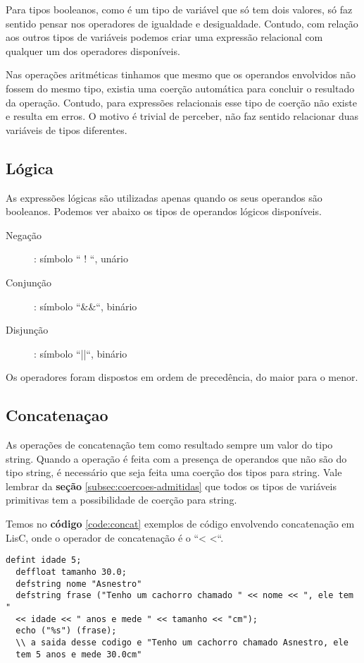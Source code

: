 \documentclass[
  12pt,				%
  oneside,			%
  a4paper,			%
  english,			%
  french,				%
  spanish,			%
  brazil,				%
]{abntex2}
\begin{document}
Para tipos booleanos, como é um tipo de variável que só tem dois
valores, só faz sentido pensar nos operadores de igualdade e
desigualdade. Contudo, com relação aos outros tipos de variáveis
podemos criar uma expressão relacional com qualquer um dos operadores
disponíveis.

Nas operações aritméticas tinhamos que mesmo que os
operandos envolvidos não fossem do mesmo tipo, existia uma coerção
automática para concluir o resultado da operação. Contudo, para
expressões relacionais esse tipo de coerção não existe e resulta em
erros. O motivo é trivial de perceber, não faz sentido relacionar duas
variáveis de tipos diferentes.

\subsection{Lógica}
\label{subsec:logicas}

As expressões lógicas são utilizadas apenas quando os seus operandos
são booleanos. Podemos ver abaixo os tipos de operandos lógicos
disponíveis.

\begin{description}
\item [Negação]: símbolo `` ! ``, unário
\item [Conjunção]: símbolo ``\&\&``, binário
\item [Disjunção]: símbolo ``||``, binário
\end{description}

Os operadores foram dispostos em ordem de precedência, do maior para o
menor.

\subsection{Concatenaçao}
\label{subsec:concatenacao}

As operações de concatenação tem como resultado sempre um valor do
tipo string. Quando a operação é feita com a presença de operandos que
não são do tipo string, é necessário que seja feita uma coerção dos
tipos para string. Vale lembrar da \textbf{seção} \ref{subsec:coercoes-admitidas} que todos os tipos de
variáveis primitivas tem a possibilidade de coerção para
string.


Temos no \textbf{código} \ref{code:concat} exemplos de código
envolvendo concatenação em LisC, onde o operador de concatenação é o
``< <``.

\begin{lstlisting}[label=code:concat,caption=Exemplo de expressões de concatenação]
  defint idade 5;
  deffloat tamanho 30.0;
  defstring nome "Asnestro"
  defstring frase ("Tenho um cachorro chamado " << nome << ", ele tem "
  << idade << " anos e mede " << tamanho << "cm");
  echo ("%s") (frase);
  \\ a saida desse codigo e "Tenho um cachorro chamado Asnestro, ele
  tem 5 anos e mede 30.0cm"
\end{lstlisting}
\end{document}

